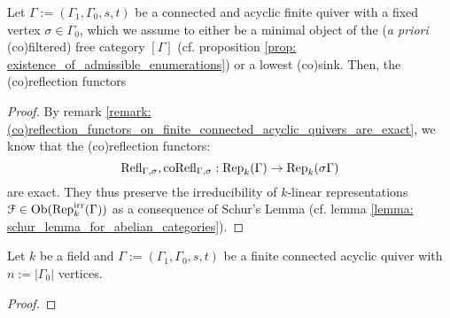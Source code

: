             \begin{lemma} \label{prop: (co)reflection_functors_on_finite_connected_acyclic_quivers_preserve_irreducible_representations}
                Let $\Gamma := (\Gamma_1, \Gamma_0, s, t)$ be a connected and acyclic finite quiver with a fixed vertex $\sigma \in \Gamma_0$, which we assume to either be a minimal object of the (\textit{a priori} (co)filtered) free category $[\Gamma]$ (cf. proposition \ref{prop: existence_of_admissible_enumerations}) or a lowest (co)sink. Then, the (co)reflection functors 
            \end{lemma}
                \begin{proof}
                    By remark \ref{remark: (co)reflection_functors_on_finite_connected_acyclic_quivers_are_exact}, we know that the (co)reflection functors:
                        $$\mathrm{Refl}_{\Gamma, \sigma}, \mathrm{co}\mathrm{Refl}_{\Gamma, \sigma}: \mathrm{Rep}_k(\Gamma) \to \mathrm{Rep}_k(\sigma \Gamma)$$
                    are exact. They thus preserve the irreducibility of $k$-linear representations $\mathcal{F} \in \mathrm{Ob}(\mathrm{Rep}_k^{\mathrm{irr}}(\Gamma))$ as a consequence of Schur's Lemma (cf. lemma \ref{lemma: schur_lemma_for_abelian_categories}).
                \end{proof}
            \begin{corollary} \label{coro: (co)reflection_functors_and_grothendieck_groups}
                
            \end{corollary}
            \begin{proposition} \label{prop: (co)reflections_of_indecomposable_representations_of_finite_connected_acyclic_quivers}
                Let $k$ be a field and $\Gamma := (\Gamma_1, \Gamma_0, s, t)$ be a finite connected acyclic quiver with $n := |\Gamma_0|$ vertices.  
            \end{proposition}
                \begin{proof}
                    
                \end{proof}
            
